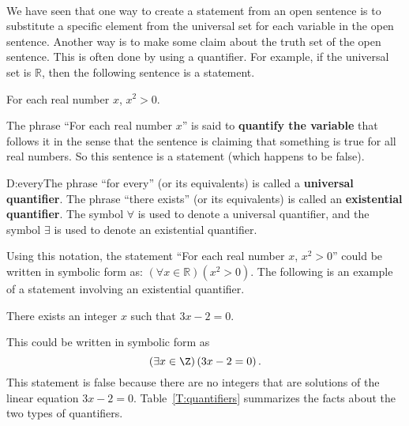 \begin{previewactivity}\label{PA:quantifier} \hfill \\
%
We have seen that one way to create a statement from an open sentence is to substitute a specific element from the universal set for each variable in the open sentence.  Another way is to make some claim about the truth set of the open sentence.  This is often done by using a quantifier.    For example, if the universal set is  $\mathbb{R}$, then the following sentence is a statement.
\begin{center}
For each real number  $x$,  $x^2 > 0$.
\end{center}
The phrase ``For each real number  $x$'' is said to \textbf{quantify the variable} that follows it in the sense that the sentence is claiming that something is true for all real numbers.  So this sentence is a statement (which happens to be false).
%
\begin{defbox}{D:every}{The phrase ``for every'' (or its equivalents) is called a \textbf{universal quantifier}.
%
%
  The phrase ``there exists'' (or its equivalents) is called an \textbf{existential quantifier}.
%
%
  The symbol $\forall$ 
\label{sym:forall}%
 is used to denote a universal quantifier, and the symbol  $\exists $ 
\label{sym:exist}%
 is used to denote an existential quantifier.}
\end{defbox}
Using this notation, the statement ``For each real number  $x$,  $x^2 > 0$'' could be written in symbolic form as: $\left( {\forall x \in \mathbb{R}} \right)\left( {x^2 > 0} \right)$.
The following is an example of a statement involving an existential quantifier.
\begin{center}
There exists an integer $x$ such that  $3x - 2 = 0$.
\end{center}
This could be written in symbolic form as
\[
\left( {\exists x \in \Z} \right) \left( 3x - 2 = 0 \right).
\]
This statement is false because there are no integers that are solutions of the linear equation $3x - 2 = 0$.
Table~\ref{T:quantifiers} summarizes the facts about the two types of quantifiers.


\end{previewactivity}
